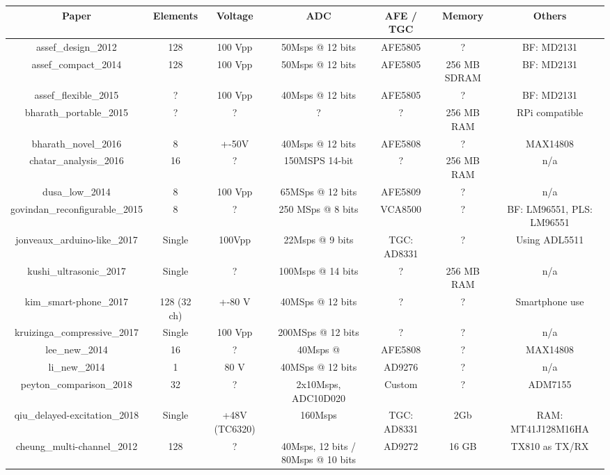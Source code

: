 
\begin{center}
 \begin{tabular}{||c | c c c c c | c ||} 

 \hline
 Paper 			& Elements 	& Voltage 	& ADC 			& AFE / TGC 	& Memory 	& Others\\ [0.5ex] 
 \hline\hline	
 assef_design_2012	& 128		& 100 Vpp 	& 50Msps @ 12 bits	& AFE5805	& ? 		& BF: MD2131 \\ 
 \hline
 assef_compact_2014	& 128		& 100 Vpp  	& 50Msps @ 12 bits	& AFE5805	& 256 MB SDRAM  & BF: MD2131 \\ 
 \hline
 assef_flexible_2015	& ? 		& 100 Vpp 	& 40Msps @ 12 bits 	& AFE5805	&  ?		& BF: MD2131 \\ 
 \hline
 bharath_portable_2015	& ?	 	& ?	 	& ?			& ?		& 256 MB RAM	& RPi compatible\\ 
 \hline
 bharath_novel_2016	& 8	 	& +-50V	 	& 40Msps @ 12 bits	& AFE5808	& ? 		& MAX14808 \\ 
 \hline
 chatar_analysis_2016	& 16	 	& ?	 	& 150MSPS 14-bit	& ?		& 256 MB RAM	& n/a \\ 
 \hline
 dusa_low_2014		& 8 		& 100 Vpp 	& 65MSps @ 12 bits 	& AFE5809	& ? 		& n/a \\ 
 \hline
 govindan_reconfigurable_2015	& 8	 & ?	 	& 250 MSps @ 8 bits	& VCA8500	& ? 		& BF: LM96551, PLS: LM96551\\ 
 \hline
 jonveaux_arduino-like_2017	& Single & 100Vpp 	& 22Msps @ 9 bits	& TGC: AD8331	& ? 		& Using ADL5511 \\ 
 \hline
 kushi_ultrasonic_2017	& Single	& ?		& 100Msps @ 14 bits 	& ?		& 256 MB RAM	& n/a \\
 \hline
 kim_smart-phone_2017	& 128 (32 ch)	& +-80 V 	& 40MSps @ 12 bits 	& ?		& ? 		& Smartphone use\\ 
 \hline
 kruizinga_compressive_2017 & Single 	& 100 Vpp 	& 200MSps @ 12 bits 	& ?		& ?		& n/a \\
 \hline
 lee_new_2014		& 16 		& ?		& 40Msps @		& AFE5808	& ? 		& MAX14808\\ 
 \hline
 li_new_2014		& 1	 	& 80 V	 	& 40MSps @ 12 bits 	& AD9276	& ?		& n/a \\
 \hline
 peyton_comparison_2018	& 32	 	& ?	 	& 2x10Msps, ADC10D020	& Custom	& ? 		& ADM7155\\ 
 \hline
 qiu_delayed-excitation_2018 	& Single  & +48V (TC6320) & 160Msps		& TGC: AD8331	& 2Gb		& RAM: MT41J128M16HA \\ 
 \hline
 cheung_multi-channel_2012 & 	128 	& ?		& 40Msps, 12 bits / 80Msps @ 10 bits & AD9272 & 16 GB 	& TX810 as TX/RX	

\end{tabular}
\end{center}
